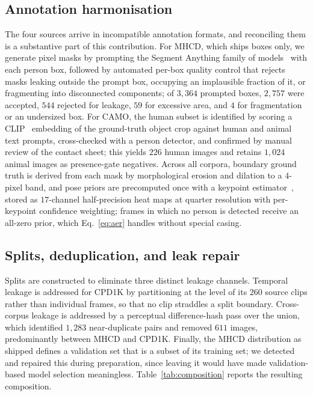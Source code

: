\documentclass[3p,times,procedia]{elsarticle}
\begin{document}
\subsection{Annotation harmonisation}

The four sources arrive in incompatible annotation formats, and reconciling them is a substantive part of this contribution. For MHCD, which ships boxes only, we generate pixel masks by prompting the Segment Anything family of models~\cite{sam,mobilesam,sam2} with each person box, followed by automated per-box quality control that rejects masks leaking outside the prompt box, occupying an implausible fraction of it, or fragmenting into disconnected components; of $3{,}364$ prompted boxes, $2{,}757$ were accepted, $544$ rejected for leakage, $59$ for excessive area, and $4$ for fragmentation or an undersized box. For CAMO, the human subset is identified by scoring a CLIP~\cite{clip} embedding of the ground-truth object crop against human and animal text prompts, cross-checked with a person detector, and confirmed by manual review of the contact sheet; this yields $226$ human images and retains $1{,}024$ animal images as presence-gate negatives. Across all corpora, boundary ground truth is derived from each mask by morphological erosion and dilation to a $4$-pixel band, and pose priors are precomputed once with a keypoint estimator~\cite{yolo11}, stored as $17$-channel half-precision heat maps at quarter resolution with per-keypoint confidence weighting; frames in which no person is detected receive an all-zero prior, which Eq.~\eqref{eq:aer} handles without special casing.

\subsection{Splits, deduplication, and leak repair}

Splits are constructed to eliminate three distinct leakage channels. Temporal leakage is addressed for CPD1K by partitioning at the level of its $260$ source clips rather than individual frames, so that no clip straddles a split boundary. Cross-corpus leakage is addressed by a perceptual difference-hash pass over the union, which identified $1{,}283$ near-duplicate pairs and removed $611$ images, predominantly between MHCD and CPD1K. Finally, the MHCD distribution as shipped defines a validation set that is a subset of its training set; we detected and repaired this during preparation, since leaving it would have made validation-based model selection meaningless. Table~\ref{tab:composition} reports the resulting composition.
\end{document}

